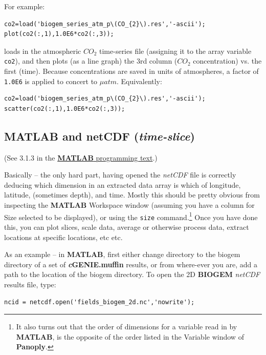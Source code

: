 \documentclass[11pt,fleqn]{book} %
\begin{document}
For example:
\small\begin{verbatim}
co2=load('biogem_series_atm_p\(CO_{2}\).res','-ascii');
plot(co2(:,1),1.0E6*co2(:,3));
\end{verbatim}\normalsize
loads in the atmospheric \(CO_{2}\) time-series file (assigning it to the array variable \texttt{co2}), and then plots (as a line graph) the 3rd column (\(CO_{2}\) concentration) vs. the first (time). Because concentrations are saved in units of atmospheres, a factor of \texttt{1.0E6} is applied to concert to \(\mu atm\). Equivalently:
\small\begin{verbatim}
co2=load('biogem_series_atm_p\(CO_{2}\).res','-ascii');
scatter(co2(:,1),1.0E6*co2(:,3));
\end{verbatim}\normalsize


\subsection{MATLAB and netCDF (\textit{time-slice})}

(See 3.1.3 in the  \href{http://www.seao2.info//teaching/201718.GEO111/GEO111.pdf}{\textbf{MATLAB} programming text}.)

\noindent Basically -- the only hard part, having opened the \textit{netCDF} file is correctly deducing which dimension in an extracted data array is which of longitude, latitude, (sometimes depth), and time. Mostly this should be pretty obvious from inspecting the \textbf{MATLAB} \footnotesize\textsf{Workspace }\normalsize window (assuming you have a column for \footnotesize\textsf{Size }\normalsize selected to be displayed), or using the \texttt{size} command.\footnote{It also turns out that the order of dimensions for a variable read in by \textbf{MATLAB}, is the opposite of the order listed in the \textsf{Variable} window of \textbf{Panoply}.} Once you have done this, you can plot slices, scale data, average or otherwise process data, extract locations at specific locations, etc etc.

As an example -- in \textbf{MATLAB}, first either change directory to the \textsf{\small biogem} directory of a set of \textbf{\textit{c}GENIE.muffin} results, or from where-ever you are, add a path to the location of the \textsf{\small biogem} directory. To open the 2D \textbf{BIOGEM} \textit{netCDF} results file, type:

\begin{verbatim}
ncid = netcdf.open('fields_biogem_2d.nc','nowrite');
\end{verbatim}
\end{document}
